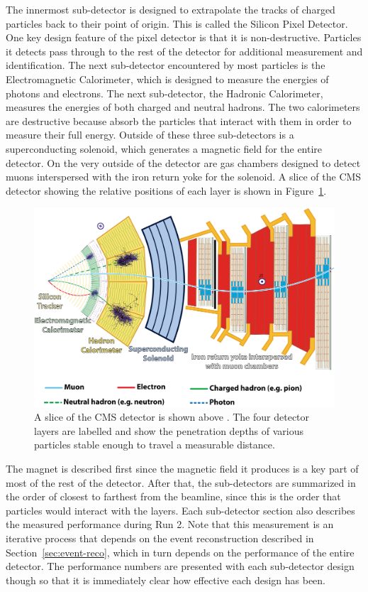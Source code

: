 The innermost sub-detector is designed to extrapolate the tracks of charged particles
back to their point of origin.
This is called the Silicon Pixel Detector.
One key design feature of the pixel detector is that it is non-destructive.
Particles it detects pass through to the rest of the detector for additional
measurement and identification.
The next sub-detector encountered by most particles is the Electromagnetic Calorimeter,
which is designed to measure the energies of photons and electrons.
The next sub-detector, the Hadronic Calorimeter,
measures the energies of both charged and neutral hadrons.
The two calorimeters are destructive because absorb the particles that interact with them
in order to measure their full energy.
Outside of these three sub-detectors is a superconducting solenoid,
which generates a magnetic field for the entire detector.
On the very outside of the detector are gas chambers designed to detect muons
interspersed with the iron return yoke for the solenoid.
A slice of the CMS detector showing the relative positions of each layer
is shown in Figure~\ref{fig:slice}.
\begin{figure}
  \centering
  \includegraphics[width=0.9\linewidth]{figures/CMSslice_whiteBackground.png}
  \caption[CMS detector slice]{
    A slice of the CMS detector is shown above \cite{Barney:2120661}.
    The four detector layers are labelled and show the penetration
    depths of various particles stable enough to travel a measurable distance.
    }
  \label{fig:slice}
\end{figure}

The magnet is described first since the magnetic field it produces is a key
part of most of the rest of the detector.
After that, the sub-detectors are summarized in the order of closest to farthest
from the beamline, since this is the order that particles would interact with the layers.
Each sub-detector section also describes the measured performance during Run 2.
Note that this measurement is an iterative process that depends on the event reconstruction
described in Section~\ref{sec:event-reco},
which in turn depends on the performance of the entire detector.
The performance numbers are presented with each sub-detector design though so that
it is immediately clear how effective each design has been.

